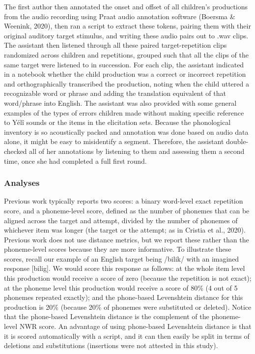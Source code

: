 \documentclass[
  american,
  ,man,floatsintext]{apa6}
\begin{document}
The first author then annotated the onset and offset of all children's productions from the audio recording using Praat audio annotation software (Boersma \& Weenink, 2020), then ran a script to extract these tokens, pairing them with their original auditory target stimulus, and writing these audio pairs out to .wav clips. The assistant then listened through all these paired target-repetition clips randomized across children and repetitions, grouped such that all the clips of the same target were listened to in succession. For each clip, the assistant indicated in a notebook whether the child production was a correct or incorrect repetition and orthographically transcribed the production, noting when the child uttered a recognizable word or phrase and adding the translation equivalent of that word/phrase into English. The assistant was also provided with some general examples of the types of errors children made without making specific reference to Yélî sounds or the items in the elicitation sets. Because the phonological inventory is so acoustically packed and annotation was done based on audio data alone, it might be easy to misidentify a segment. Therefore, the assistant double-checked all of her annotations by listening to them and assessing them a second time, once she had completed a full first round.

\hypertarget{analyses}{%
\subsubsection{Analyses}\label{analyses}}

Previous work typically reports two scores: a binary word-level exact repetition score, and a phoneme-level score, defined as the number of phonemes that can be aligned across the target and attempt, divided by the number of phonemes of whichever item was longer (the target or the attempt; as in Cristia et al., 2020). Previous work does not use distance metrics, but we report these rather than the phoneme-level scores because they are more informative. To illustrate these scores, recall our example of an English target being /bilik/ with an imagined response {[}bilig{]}. We would score this response as follows: at the whole item level this production would receive a score of zero (because the repetition is not exact); at the phoneme level this production would receive a score of 80\% (4 out of 5 phonemes repeated exactly); and the phone-based Levenshtein distance for this production is 20\% (because 20\% of phonemes were substituted or deleted). Notice that the phone-based Levenshtein distance is the complement of the phoneme-level NWR score. An advantage of using phone-based Levenshtein distance is that it is scored automatically with a script, and it can then easily be split in terms of deletions and substitutions (insertions were not attested in this study).
\end{document}
